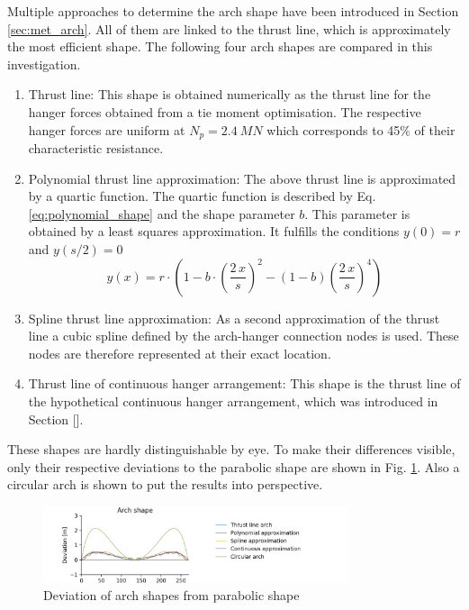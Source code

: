 Multiple approaches to determine the arch shape have been introduced in Section \ref{sec:met_arch}. All of them are linked to the thrust line, which is approximately the most efficient shape. The following four arch shapes are compared in this investigation.
\begin{enumerate}
    \item Thrust line: This shape is obtained numerically as the thrust line for the hanger forces obtained from a tie moment optimisation. The respective hanger forces are uniform at $N_p=\SI{2.4}{MN}$ which corresponds to 45\% of their characteristic resistance.
    \item Polynomial thrust line approximation: The above thrust line is approximated by a quartic function. The quartic function is described by Eq. \eqref{eq:polynomial_shape} and the shape parameter $b$. This parameter is obtained by a least squares approximation. It fulfills the conditions $y(0)=r$ and $y(s/2)=0$
    \begin{equation}
        y(x)=r \cdot \left(1 - b \cdot \left(\frac{2\,x}{s}\right)^2 - (1-b) \left(\frac{2\,x}{s}\right)^4 \right)
        \label{eq:polynomial_shape}
    \end{equation}
    \item Spline thrust line approximation: As a second approximation of the thrust line a cubic spline defined by the arch-hanger connection nodes is used. These nodes are therefore represented at their exact location.
    \item Thrust line of continuous hanger arrangement: This shape is the thrust line of the hypothetical continuous hanger arrangement, which was introduced in Section [].
\end{enumerate}

These shapes are hardly distinguishable by eye. To make their differences visible, only their respective deviations to the parabolic shape are shown in Fig. \ref{fig:arch_shapes_13}. Also a circular arch is shown to put the results into perspective.

\begin{figure}[H]
    \centering
    \includegraphics[trim={0 0 2cm 0},clip, width=0.8\textwidth]{calculations/arch shape/arch_shapes_13.png}
    \caption{Deviation of arch shapes from parabolic shape}
    \label{fig:arch_shapes_13}
\end{figure}

